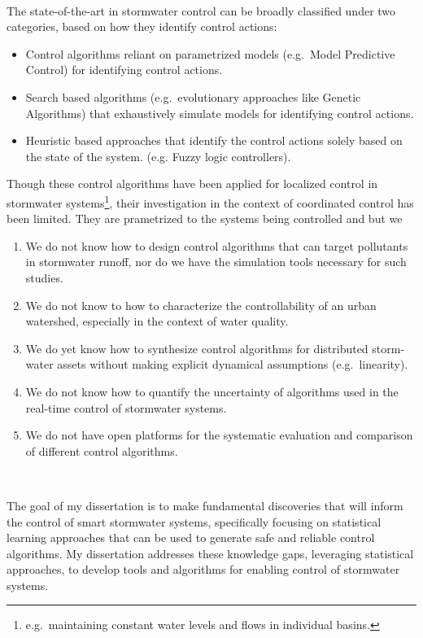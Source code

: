 \

The state-of-the-art in stormwater control can be broadly classified under two categories, based on how they identify control actions:
\begin{itemize}
	\item Control algorithms reliant on parametrized models (e.g.\ Model Predictive Control) for identifying control actions.
	\item Search based algorithms (e.g.\ evolutionary approaches like Genetic Algorithms) that exhaustively simulate models for identifying control actions.
	\item Heuristic based approaches that identify the control actions solely based on the state of the system. (e.g. Fuzzy logic controllers). 
\end{itemize}
Though these control algorithms have been applied for localized control in stormwater systems\footnote{e.g.\ maintaining constant water levels and flows in individual basins.}, their investigation in the context of coordinated control has been limited.
They are prametrized to the systems being controlled and but we 
\begin{enumerate}
	\item We do not know how to design control algorithms that can target pollutants in stormwater runoff, nor do we have the simulation tools necessary for such studies.
	\item We do not know to how to characterize the controllability of an urban watershed, especially in the context of water quality.
	\item We do yet know how to synthesize control algorithms for distributed storm-water assets without making explicit dynamical assumptions (e.g.\ linearity).
	\item We do not know how to quantify the uncertainty of algorithms used in the real-time control of stormwater systems.
	\item We do not have open platforms for the systematic evaluation and comparison of different control algorithms.
\end{enumerate}

\

The goal of my dissertation is to make fundamental discoveries that will inform the control of smart stormwater systems, specifically focusing on statistical learning approaches that can be used to generate safe and reliable control algorithms. My dissertation addresses these knowledge gaps, leveraging statistical approaches, to develop tools and algorithms for enabling control of stormwater systems. 


